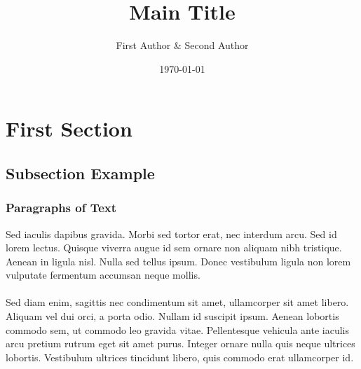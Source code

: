 \documentclass[aspectratio=169]{beamer}
\title[short title]{\huge Main Title}
\author{First Author \& Second Author}
\institute{Food and Resource Economics Department}
\date{\today}
\begin{document}
\begin{frame}[plain]
\Background
    \titlepage
\end{frame}


\section{First Section} %

\subsection{Subsection Example} %


\begin{frame}
\frametitle{Paragraphs of Text}
Sed iaculis dapibus gravida. Morbi sed tortor erat, nec interdum arcu. Sed id lorem lectus. Quisque viverra augue id sem ornare non aliquam nibh tristique. Aenean in ligula nisl. Nulla sed tellus ipsum. Donec vestibulum ligula non lorem vulputate fermentum accumsan neque mollis.\\~\\

Sed diam enim, sagittis nec condimentum sit amet, ullamcorper sit amet libero. Aliquam vel dui orci, a porta odio. Nullam id suscipit ipsum. Aenean lobortis commodo sem, ut commodo leo gravida vitae. Pellentesque vehicula ante iaculis arcu pretium rutrum eget sit amet purus. Integer ornare nulla quis neque ultrices lobortis. Vestibulum ultrices tincidunt libero, quis commodo erat ullamcorper id.
\end{frame}
\end{document}
